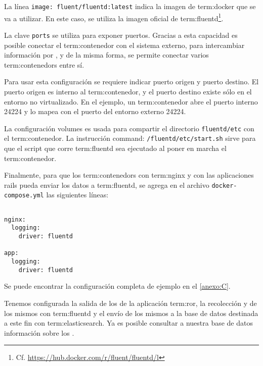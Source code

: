 La línea \lstinline{image: fluent/fluentd:latest} indica la imagen de
\gls{term:docker} que se va a utilizar. En este caso, se utiliza la imagen
oficial de \gls{term:fluentd}\footnote{Cf.
\url{https://hub.docker.com/r/fluent/fluentd/l}}.

La clave \lstinline{ports} se utiliza para exponer puertos. Gracias a esta capacidad es
posible conectar el \gls{term:contenedor} con el sistema externo, para intercambiar
información por , y de la misma forma, se permite conectar varios
\glspl{term:contenedor} entre sí.

Para usar esta configuración se requiere indicar puerto origen y puerto
destino. El puerto origen es interno al \gls{term:contenedor}, y el puerto destino existe
sólo en el entorno no virtualizado. En el ejemplo, un \gls{term:contenedor} abre el puerto
interno 24224 y lo mapea con el puerto del entorno externo 24224.

La configuración volumes es usada para compartir el directorio
\lstinline{fluentd/etc} con el \gls{term:contenedor}. La instrucción command:
\texttt{/fluentd/etc/start.sh} sirve para que el script que corre
\gls{term:fluentd} sea ejecutado al poner en marcha el \gls{term:contenedor}.

Finalmente, para que los \glspl{term:contenedor} con \gls{term:nginx} y con las aplicaciones rails
pueda enviar los datos a \gls{term:fluentd}, se agrega en el archivo
\lstinline{docker-compose.yml} las siguientes líneas:

\begin{lstlisting}

nginx:
  logging:
    driver: fluentd

app:
  logging:
    driver: fluentd

\end{lstlisting}

Se puede encontrar la configuración completa de ejemplo en el \autoref{anexo:C}.

Tenemos configurada la salida de los  de la
aplicación \gls{term:ror}, la recolección y  de los mismos con
\gls{term:fluentd} y el envío de los mismos a la base de datos destinada a este
fin con \gls{term:elasticsearch}. Ya es posible consultar a nuestra base
de datos información sobre los .
